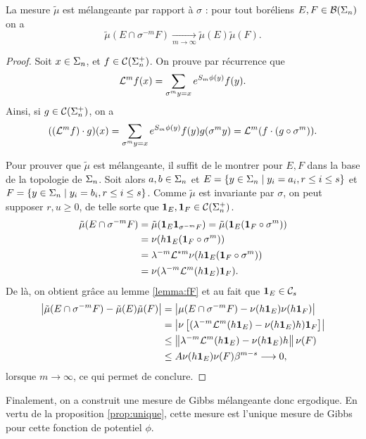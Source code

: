   \begin{proposition}
    La mesure $\tilde\mu$ est mélangeante par rapport à $\sigma$ : pour tout boréliens $E, F \in \mathcal B(\Sigma_n)$ on a
    $$\tilde\mu(E \cap \sigma^{-m} F) \underset{m\to\infty}{\longrightarrow} \tilde\mu(E)\tilde\mu(F).$$
  \end{proposition}

  \begin{proof}
    Soit $x \in \Sigma_n$, et $f \in \mathcal{C} (\Sigma_{n}^+)$. On prouve par récurrence que
    $$\mathcal{L}^mf(x) = \sum_{\sigma^my=x}{e^{S_m\phi(y)}f(y)}.$$
    Ainsi, si $g \in \mathcal{C} (\Sigma_{n}^+)$, on a
    $$((\mathcal{L}^mf)\cdot g)(x) = \sum_{\sigma^my = x}{e^{S_m\phi(y)}f(y)g(\sigma^my)} = \mathcal{L}^m(f\cdot(g\circ\sigma^m)).$$

    Pour prouver que $\tilde\mu$ est mélangeante, il suffit de le montrer pour $E, F$ dans la base de la topologie de $\Sigma_n$.
    Soit alors $a, b \in \Sigma_n$ et $E = \{y \in \Sigma_n \mid y_i = a_i, r \leq i \leq s \}$ et $F = \{y \in \Sigma_n \mid y_i = b_i, r \leq i \leq s \}$.
    Comme $\tilde\mu$ est invariante par $\sigma$, on peut supposer $r, u \geq 0$, de telle sorte que $\mathbf{1}_{E}, \mathbf{1}_{F} \in \mathcal{C} (\Sigma_{n}^+)$.
    \begin{align*}
      \tilde\mu(E\cap\sigma^{-m}F) &= \tilde\mu(\mathbf{1}_{E}\mathbf{1}_{\sigma^{-m}F}) = \tilde\mu(\mathbf{1}_{E}(\mathbf{1}_{F}\circ\sigma^m)) \\
				   &= \nu(h\mathbf{1}_{E}(\mathbf{1}_{F}\circ\sigma^m)) \\
				   &= \lambda^{-m}\mathcal{L}^{*m}\nu(h\mathbf{1}_{E}(\mathbf{1}_{F}\circ\sigma^m)) \\
				   &= \nu(\lambda^{-m}\mathcal{L}^m(h\mathbf{1}_{E})\mathbf{1}_{F}).
    \end{align*}
    De là, on obtient grâce au lemme \ref{lemma:fF} et au fait que $\mathbf{1}_{E} \in \mathcal C_{s}$
    \begin{align*}
      \left|\tilde\mu(E\cap\sigma^{-m}F)-\tilde\mu(E)\tilde\mu(F)\right| &= \left|\mu(E\cap\sigma^{-m}F) - \nu(h\mathbf{1}_{E})\nu(h\mathbf{1}_{F})\right| \\
									 &= \left|\nu\left[(\lambda^{-m}\mathcal{L}^m(h\mathbf{1}_{E})-\nu(h\mathbf{1}_{E})h)\mathbf{1}_{F}\right]\right| \\
									 &\leq \left\lVert \lambda^{-m}\mathcal{L}^m(h\mathbf{1}_{E}) - \nu(h\mathbf{1}_{E})h\right\rVert\nu(F) \\
									 &\leq A\nu(h\mathbf{1}_{E})\nu(F)\beta^{m-s} \longrightarrow 0,
    \end{align*}
    lorsque $m \to \infty$, ce qui permet de conclure.
  \end{proof}

  Finalement, on a construit une mesure de Gibbs mélangeante donc ergodique. En vertu de la proposition \ref{prop:unique},
  cette mesure est l'unique mesure de Gibbs pour cette fonction de potentiel $\phi$.
